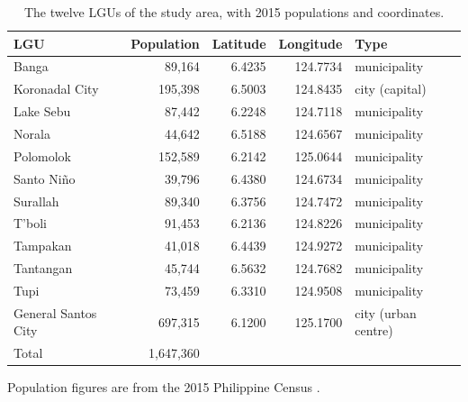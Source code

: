 \documentclass[a4paper,11pt]{article}
\begin{document}
\begin{table}[htbp]
\centering
\caption{The twelve LGUs of the study area, with 2015 populations and coordinates.}
\label{tab:lgus}
\small
\begin{tabular}{lrrrl}
\toprule
\textbf{LGU} & \textbf{Population} & \textbf{Latitude} & \textbf{Longitude} & \textbf{Type} \\
\midrule
Banga            & 89{,}164  & 6.4235 & 124.7734 & municipality \\
Koronadal City   & 195{,}398 & 6.5003 & 124.8435 & city (capital) \\
Lake Sebu        & 87{,}442  & 6.2248 & 124.7118 & municipality \\
Norala           & 44{,}642  & 6.5188 & 124.6567 & municipality \\
Polomolok        & 152{,}589 & 6.2142 & 125.0644 & municipality \\
Santo Ni\~{n}o   & 39{,}796  & 6.4380 & 124.6734 & municipality \\
Surallah         & 89{,}340  & 6.3756 & 124.7472 & municipality \\
T'boli           & 91{,}453  & 6.2136 & 124.8226 & municipality \\
Tampakan         & 41{,}018  & 6.4439 & 124.9272 & municipality \\
Tantangan        & 45{,}744  & 6.5632 & 124.7682 & municipality \\
Tupi             & 73{,}459  & 6.3310 & 124.9508 & municipality \\
General Santos City & 697{,}315 & 6.1200 & 125.1700 & city (urban centre) \\
\midrule
Total            & 1{,}647{,}360 & & & \\
\bottomrule
\end{tabular}

\smallskip
\noindent\small Population figures are from the 2015 Philippine Census
\cite{PSA2015}.
\end{table}
\end{document}
